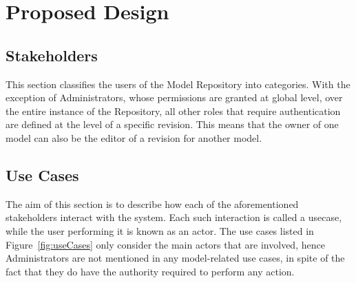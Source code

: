 \section{Proposed Design}
\label{proposedDesign}

\subsection{Stakeholders}
\label{stakeholders}
This section classifies the users of the \ddmore Model Repository into categories. With the exception of Administrators, whose permissions are granted at global level, over the entire instance of the Repository, all other roles that require authentication are defined at the level of a specific revision. This means that the owner of one model can also be the editor of a revision for another model. 


\subsection{Use Cases}
\label{useCases}
The aim of this section is to describe how each of the aforementioned stakeholders interact with the system. Each such interaction is called a \gls{usecase}, while the user performing it is known as an \gls{actor}. The use cases listed in Figure~\ref{fig:useCases} only consider the main actors that are involved, hence Administrators are not mentioned in any model-related use cases, in spite of the fact that they do have the authority required to perform any action. 

